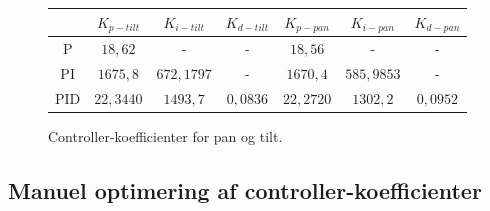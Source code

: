 \begin{figure}[th!]
\centering
\begin{tabular}{c|c|c|c|c|c|c}
&\(K_{p-tilt}\) & \(K_{i-tilt}\) & \(K_{d-tilt}\)&\(K_{p-pan}\) & \(K_{i-pan}\) & \(K_{d-pan}\)\\\hline
P&\(18,62\) &-&-&\(18,56\)&-&-\\
PI&\(1675,8\) & \( 672,1797\) &-&\(1670,4\) & \( 585,9853  \) &-\\
PID&\(22,3440 \) &  \( 1493,7 \) & \(0,0836  \)&\(22,2720 \) &  \( 1302,2 \) & \(0,0952  \)
\end{tabular}
\captionsetup{type=table}
\caption[Controller-koefficienter, Ziegler-Nichols Tuning Methode]{Controller-koefficienter for pan og tilt.}\label{tb:ZieglerNichols}
\end{figure}




\subsection{Manuel optimering af controller-koefficienter}
